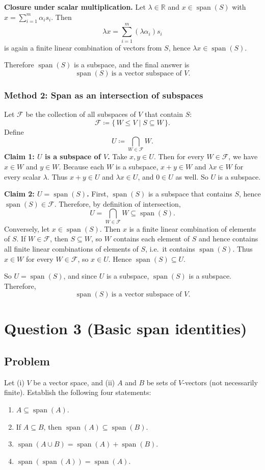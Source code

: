 \documentclass[12pt]{article}
\newcommand{\R}{\mathbb{R}}
\newcommand{\Span}{\operatorname{span}}
\begin{document}
\textbf{Closure under scalar multiplication.}
Let \(\lambda\in\R\) and \(x\in \Span(S)\) with \(x=\sum_{i=1}^m \alpha_i s_i\).
Then
\[
\lambda x=\sum_{i=1}^m (\lambda\alpha_i)s_i
\]
is again a finite linear combination of vectors from \(S\), hence \(\lambda x\in \Span(S)\).

Therefore \(\Span(S)\) is a subspace, and the final answer is
\[
\boxed{\,\Span(S)\ \text{is a vector subspace of }V.\,}
\]

\subsubsection{Method 2: Span as an intersection of subspaces}
Let \(\mathcal{F}\) be the collection of all subspaces of \(V\) that contain \(S\):
\[
\mathcal{F}\coloneqq \{\,W\le V \mid S\subseteq W\,\}.
\]
Define
\[
U\coloneqq \bigcap_{W\in\mathcal{F}} W.
\]
\textbf{Claim 1: \(U\) is a subspace of \(V\).}
Take \(x,y\in U\). Then for every \(W\in\mathcal{F}\), we have \(x\in W\) and \(y\in W\).
Because each \(W\) is a subspace, \(x+y\in W\) and \(\lambda x\in W\) for every scalar \(\lambda\).
Thus \(x+y\in U\) and \(\lambda x\in U\), and \(0\in U\) as well.
So \(U\) is a subspace.

\textbf{Claim 2: \(U=\Span(S)\).}
First, \(\Span(S)\) is a subspace that contains \(S\), hence \(\Span(S)\in\mathcal{F}\).
Therefore, by definition of intersection,
\[
U=\bigcap_{W\in\mathcal{F}}W \subseteq \Span(S).
\]
Conversely, let \(x\in \Span(S)\). Then \(x\) is a finite linear combination of elements of \(S\).
If \(W\in\mathcal{F}\), then \(S\subseteq W\), so \(W\) contains each element of \(S\) and hence contains all finite linear combinations of elements of \(S\), i.e.\ it contains \(\Span(S)\).
Thus \(x\in W\) for every \(W\in\mathcal{F}\), so \(x\in U\).
Hence \(\Span(S)\subseteq U\).

So \(U=\Span(S)\), and since \(U\) is a subspace, \(\Span(S)\) is a subspace.
Therefore,
\[
\boxed{\,\Span(S)\ \text{is a vector subspace of }V.\,}
\]

\newpage
\section{Question 3 (Basic span identities)}
\subsection{Problem}
Let (i) \(V\) be a vector space, and (ii) \(A\) and \(B\) be sets of \(V\)-vectors (not necessarily finite).
Establish the following four statements:
\begin{enumerate}[label=(\alph*)]
\item \(A\subseteq \Span(A)\).
\item If \(A\subseteq B\), then \(\Span(A)\subseteq \Span(B)\).
\item \(\Span(A\cup B)=\Span(A)+\Span(B)\).
\item \(\Span(\Span(A))=\Span(A)\).
\end{enumerate}
\end{document}
